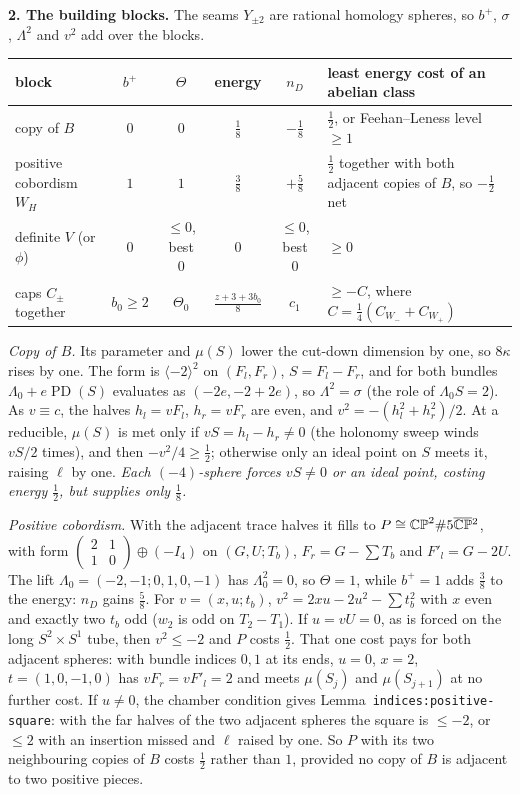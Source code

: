 \documentclass[10pt]{amsart}
\newcommand{\head}[1]{\par\vspace{2pt}\noindent\textbf{#1}\enspace}
\newenvironment{tab}{\par\vspace{2pt}\centering\small}{\par\vspace{2pt}}
\newcommand{\PD}{\operatorname{PD}}\newcommand{\lab}[1]{\texttt{#1}}
\begin{document}
\head{2. The building blocks.}
The seams $Y_{\pm2}$ are rational homology spheres, so $b^+$, $\sigma$, $\Lambda^2$ and $v^2$ add over the blocks.
\begin{tab}
\begin{tabular}{@{}lccccl@{}}
\toprule
block & $b^+$ & $\Theta$ & energy & $n_D$ & least energy cost of an abelian class\\
\midrule
copy of $B$ & $0$ & $0$ & $\tfrac18$ & $-\tfrac18$ & $\tfrac12$, or Feehan--Leness level $\ge1$\\
positive cobordism $W_H$ & $1$ & $1$ & $\tfrac38$ & $+\tfrac58$ & $\tfrac12$ together with both adjacent copies of $B$, so $-\tfrac12$ net\\
definite $V$ (or $\phi$) & $0$ & $\le0$, best $0$ & $0$ & $\le0$, best $0$ & $\ge0$\\
caps $C_\pm$ together & $b_0\ge2$ & $\Theta_0$ & $\tfrac{z+3+3b_0}8$ & $c_1$ & $\ge-C$, where $C=\frac14(C_{W_-}+C_{W_+})$\\
\bottomrule
\end{tabular}
\end{tab}
\emph{Copy of $B$.} Its parameter and $\mu(S)$ lower the cut-down dimension by one, so $8\kappa$ rises by one. The form is $\langle-2\rangle^2$ on $(F_l,F_r)$, $S=F_l-F_r$, and for both bundles $\Lambda_0+e\PD(S)$ evaluates as $(-2e,-2+2e)$, so $\Lambda^2=\sigma$ (the role of $\Lambda_0S=2$). As $v\equiv c$, the halves $h_l=vF_l$, $h_r=vF_r$ are even, and $v^2=-(h_l^2+h_r^2)/2$. At a reducible, $\mu(S)$ is met only if $vS=h_l-h_r\ne0$ (the holonomy sweep winds $vS/2$ times), and then $-v^2/4\ge\frac12$; otherwise only an ideal point on $S$ meets it, raising $\ell$ by one. \emph{Each $(-4)$-sphere forces $vS\ne0$ or an ideal point, costing energy $\frac12$, but supplies only $\frac18$.}

\emph{Positive cobordism.} With the adjacent trace halves it fills to $P\cong\mathbb{CP}^2\#5\overline{\mathbb{CP}}{}^2$, with form $\left(\begin{smallmatrix}2&1\\1&0\end{smallmatrix}\right)\oplus(-I_4)$ on $(G,U;T_b)$, $F_r=G-\sum T_b$ and $F'_l=G-2U$. The lift $\Lambda_0=(-2,-1;0,1,0,-1)$ has $\Lambda_0^2=0$, so $\Theta=1$, while $b^+=1$ adds $\frac38$ to the energy: $n_D$ gains $\frac58$. For $v=(x,u;t_b)$, $v^2=2xu-2u^2-\sum t_b^2$ with $x$ even and exactly two $t_b$ odd ($w_2$ is odd on $T_2-T_1$). If $u=vU=0$, as is forced on the long $S^2\times S^1$ tube, then $v^2\le-2$ and $P$ costs $\frac12$. That one cost pays for both adjacent spheres: with bundle indices $0,1$ at its ends, $u=0$, $x=2$, $t=(1,0,-1,0)$ has $vF_r=vF'_l=2$ and meets $\mu(S_j)$ and $\mu(S_{j+1})$ at no further cost. If $u\ne0$, the chamber condition gives Lemma~\lab{indices:positive-square}: with the far halves of the two adjacent spheres the square is $\le-2$, or $\le2$ with an insertion missed and $\ell$ raised by one. So $P$ with its two neighbouring copies of $B$ costs $\frac12$ rather than $1$, provided no copy of $B$ is adjacent to two positive pieces.
\end{document}
